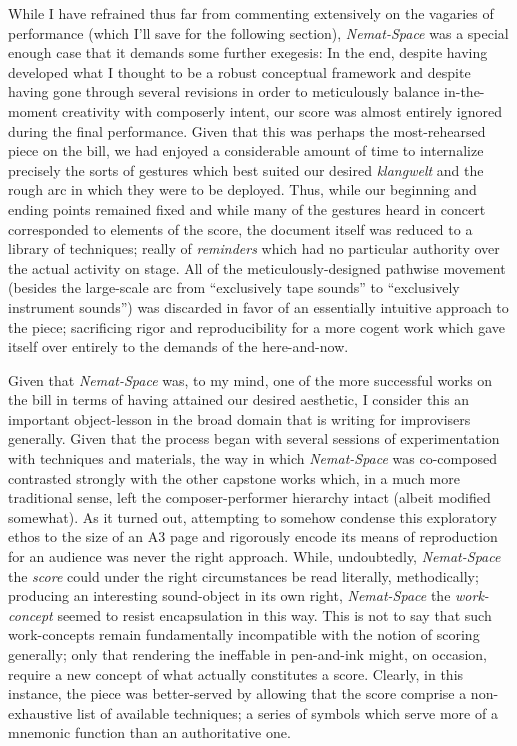     While I have refrained thus far from commenting extensively on the vagaries of performance (which I'll save for the following section), \textit{Nemat-Space} was a special enough case that it demands some further exegesis: In the end, despite having developed what I thought to be a robust conceptual framework and despite having gone through several revisions in order to meticulously balance in-the-moment creativity with composerly intent, our score was almost entirely ignored during the final performance. Given that this was perhaps the most-rehearsed piece on the bill, we had enjoyed a considerable amount of time to internalize precisely the sorts of gestures which best suited our desired \textit{klangwelt} and the rough arc in which they were to be deployed. Thus, while our beginning and ending points remained fixed and while many of the gestures heard in concert corresponded to elements of the score, the document itself was reduced to a library of techniques; really of \textit{reminders} which had no particular authority over the actual activity on stage. All of the meticulously-designed pathwise movement (besides the large-scale arc from ``exclusively tape sounds'' to ``exclusively instrument sounds'') was discarded in favor of an essentially intuitive approach to the piece; sacrificing rigor and reproducibility for a more cogent work which gave itself over entirely to the demands of the here-and-now.
    
    Given that \textit{Nemat-Space} was, to my mind, one of the more successful works on the bill in terms of having attained our desired aesthetic, I consider this an important object-lesson in the broad domain that is writing for improvisers generally. Given that the process began with several sessions of experimentation with techniques and materials, the way in which \textit{Nemat-Space} was co-composed contrasted strongly with the other capstone works which, in a much more traditional sense, left the composer-performer hierarchy intact (albeit modified somewhat). As it turned out, attempting to somehow condense this exploratory ethos to the size of an A3 page and rigorously encode its means of reproduction for an audience was never the right approach. While, undoubtedly, \textit{Nemat-Space} the \textit{score} could under the right circumstances be read literally, methodically; producing an interesting sound-object in its own right, \textit{Nemat-Space} the \textit{work-concept} seemed to resist encapsulation in this way. This is not to say that such work-concepts remain fundamentally incompatible with the notion of scoring generally; only that rendering the ineffable in pen-and-ink might, on occasion, require a new concept of what actually constitutes a score. Clearly, in this instance, the piece was better-served by allowing that the score comprise a non-exhaustive list of available techniques; a series of symbols which serve more of a mnemonic function than an authoritative one. 
    

